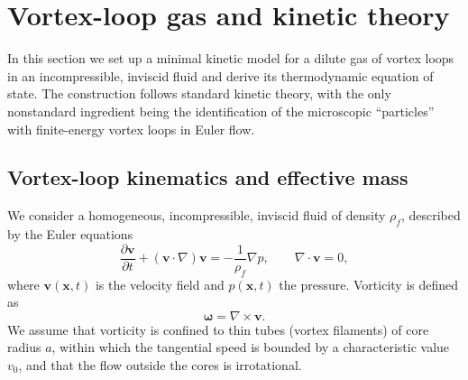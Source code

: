 \documentclass[11pt]{article}
\begin{document}
    \section{Vortex-loop gas and kinetic theory}
        \label{sec:vortex-gas}

        In this section we set up a minimal kinetic model for a dilute gas of vortex loops
        in an incompressible, inviscid fluid and derive its thermodynamic equation of state.
        The construction follows standard kinetic theory, with the only nonstandard ingredient
        being the identification of the microscopic ``particles'' with finite-energy vortex
        loops in Euler flow.

        \subsection{Vortex-loop kinematics and effective mass}

            We consider a homogeneous, incompressible, inviscid fluid of density $\rho_f$,
            described by the Euler equations
            \begin{equation}
                \frac{\partial \boldsymbol{v}}{\partial t}
                + (\boldsymbol{v}\cdot\nabla)\boldsymbol{v}
                = -\frac{1}{\rho_f}\nabla p,
                \qquad
                \nabla\cdot\boldsymbol{v} = 0,
                \label{eq:Euler}
            \end{equation}
            where $\boldsymbol{v}(\boldsymbol{x},t)$ is the velocity field and $p(\boldsymbol{x},t)$
            the pressure. Vorticity is defined as
            \begin{equation}
                \boldsymbol{\omega} = \nabla\times\boldsymbol{v}.
            \end{equation}
            We assume that vorticity is confined to thin tubes (vortex filaments) of core radius $a$,
            within which the tangential speed is bounded by a characteristic value $v_0$, and that the
            flow outside the cores is irrotational.
\end{document}

